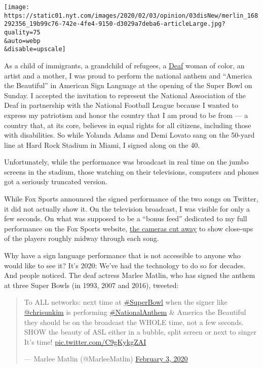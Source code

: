\texttt{[image: https://static01.nyt.com/images/2020/02/03/opinion/03disNew/merlin\_168292356\_19b99c76-742e-4fe4-9150-d3029a7deba6-articleLarge.jpg?quality=75\\\&auto=webp\\\&disable=upscale]}

As a child of immigrants, a grandchild of refugees, a
\href{https://www.nad.org/resources/american-sign-language/community-and-culture-frequently-asked-questions/}{Deaf}
woman of color, an artist and a mother, I was proud to perform the
national anthem and ``America the Beautiful'' in American Sign Language
at the opening of the Super Bowl on Sunday. I accepted the invitation to
represent the National Association of the Deaf in partnership with the
National Football League because I wanted to express my patriotism and
honor the country that I am proud to be from --- a country that, at its
core, believes in equal rights for all citizens, including those with
disabilities. So while Yolanda Adams and Demi Lovato sang on the 50-yard
line at Hard Rock Stadium in Miami, I signed along on the 40.

Unfortunately, while the performance was broadcast in real time on the
jumbo screens in the stadium, those watching on their televisions,
computers and phones got a seriously truncated version.

While Fox Sports announced the signed performance of the two songs on
Twitter, it did not actually show it. On the television broadcast, I was
visible for only a few seconds. On what was supposed to be a ``bonus
feed'' dedicated to my full performance on the Fox Sports website,
\href{https://twitter.com/mhairiforrest/status/1224168857973092354?s=21}{the
cameras cut away} to show close-ups of the players roughly midway
through each song.

Why have a sign language performance that is not accessible to anyone
who would like to see it? It's 2020: We've had the technology to do so
for decades. And people noticed. The deaf actress Marlee Matlin, who has
signed the anthem at three Super Bowls (in 1993, 2007 and 2016),
tweeted:

\begin{quote}
To ALL networks: next time at
\href{https://twitter.com/hashtag/SuperBowl?src=hash\&ref_src=twsrc\%5Etfw}{\#SuperBowl}
when the signer like
\href{https://twitter.com/chrisunkim?ref_src=twsrc\%5Etfw}{@chrisunkim}
is performing
\href{https://twitter.com/hashtag/NationalAnthem?src=hash\&ref_src=twsrc\%5Etfw}{\#NationalAnthem}
\& America the Beautiful they should be on the broadcast the WHOLE time,
not a few seconds. SHOW the beauty of ASL either in a bubble, split
screen or next to singer It's time!
\href{https://t.co/C9gKykgZAI}{pic.twitter.com/C9gKykgZAI}

--- Marlee Matlin (@MarleeMatlin)
\href{https://twitter.com/MarleeMatlin/status/1224153599506186240?ref_src=twsrc\%5Etfw}{February
3, 2020}
\end{quote}

